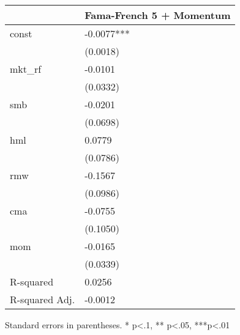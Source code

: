 \begin{table}
\caption{}
\label{}
\begin{center}
\begin{tabular}{ll}
\hline
               & Fama-French 5 + Momentum  \\
\hline
const          & -0.0077***                \\
               & (0.0018)                  \\
mkt\_rf        & -0.0101                   \\
               & (0.0332)                  \\
smb            & -0.0201                   \\
               & (0.0698)                  \\
hml            & 0.0779                    \\
               & (0.0786)                  \\
rmw            & -0.1567                   \\
               & (0.0986)                  \\
cma            & -0.0755                   \\
               & (0.1050)                  \\
mom            & -0.0165                   \\
               & (0.0339)                  \\
R-squared      & 0.0256                    \\
R-squared Adj. & -0.0012                   \\
\hline
\end{tabular}
\end{center}
\end{table}
\bigskip
Standard errors in parentheses. \newline 
* p<.1, ** p<.05, ***p<.01